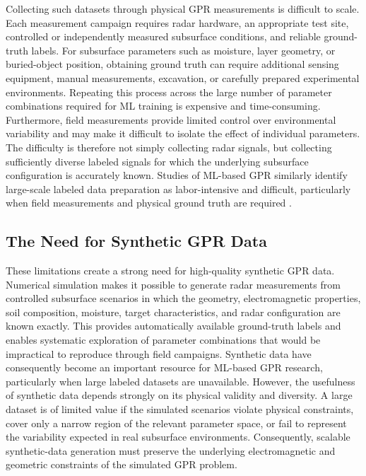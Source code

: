 \documentclass[journal]{IEEEtran}
\begin{document}
Collecting such datasets through physical GPR measurements is difficult to scale. Each measurement campaign requires radar hardware, an appropriate test site, controlled or independently measured subsurface conditions, and reliable ground-truth labels. For subsurface parameters such as moisture, layer geometry, or buried-object position, obtaining ground truth can require additional sensing equipment, manual measurements, excavation, or carefully prepared experimental environments. Repeating this process across the large number of parameter combinations required for ML training is expensive and time-consuming. Furthermore, field measurements provide limited control over environmental variability and may make it difficult to isolate the effect of individual parameters. The difficulty is therefore not simply collecting radar signals, but collecting sufficiently diverse labeled signals for which the underlying subsurface configuration is accurately known. Studies of ML-based GPR similarly identify large-scale labeled data preparation as labor-intensive and difficult, particularly when field measurements and physical ground truth are required \cite{gprMLReview}.

\subsection{The Need for Synthetic GPR Data}

These limitations create a strong need for high-quality synthetic GPR data. Numerical simulation makes it possible to generate radar measurements from controlled subsurface scenarios in which the geometry, electromagnetic properties, soil composition, moisture, target characteristics, and radar configuration are known exactly. This provides automatically available ground-truth labels and enables systematic exploration of parameter combinations that would be impractical to reproduce through field campaigns. Synthetic data have consequently become an important resource for ML-based GPR research, particularly when large labeled datasets are unavailable. However, the usefulness of synthetic data depends strongly on its physical validity and diversity. A large dataset is of limited value if the simulated scenarios violate physical constraints, cover only a narrow region of the relevant parameter space, or fail to represent the variability expected in real subsurface environments. Consequently, scalable synthetic-data generation must preserve the underlying electromagnetic and geometric constraints of the simulated GPR problem.
\end{document}
